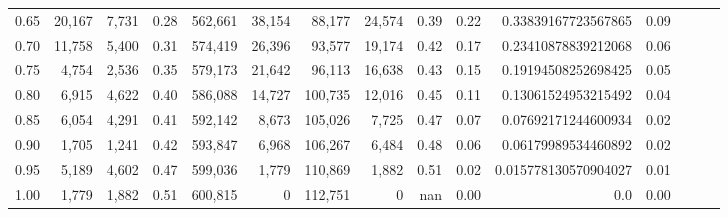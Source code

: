 \begin{tabular}{rrrrrrrrrrrrrrr}
0.65 &  20,167 &   7,731 &  0.28 &  562,661 &   38,154 &   88,177 &   24,574 &  0.39 &  0.22 &   0.33839167723567865 &      0.09 \\
0.70 &  11,758 &   5,400 &  0.31 &  574,419 &   26,396 &   93,577 &   19,174 &  0.42 &  0.17 &   0.23410878839212068 &      0.06 \\
0.75 &   4,754 &   2,536 &  0.35 &  579,173 &   21,642 &   96,113 &   16,638 &  0.43 &  0.15 &   0.19194508252698425 &      0.05 \\
0.80 &   6,915 &   4,622 &  0.40 &  586,088 &   14,727 &  100,735 &   12,016 &  0.45 &  0.11 &   0.13061524953215492 &      0.04 \\
0.85 &   6,054 &   4,291 &  0.41 &  592,142 &    8,673 &  105,026 &    7,725 &  0.47 &  0.07 &   0.07692171244600934 &      0.02 \\
0.90 &   1,705 &   1,241 &  0.42 &  593,847 &    6,968 &  106,267 &    6,484 &  0.48 &  0.06 &   0.06179989534460892 &      0.02 \\
0.95 &   5,189 &   4,602 &  0.47 &  599,036 &    1,779 &  110,869 &    1,882 &  0.51 &  0.02 &  0.015778130570904027 &      0.01 \\
1.00 &   1,779 &   1,882 &  0.51 &  600,815 &        0 &  112,751 &        0 &   nan &  0.00 &                   0.0 &      0.00 \\
\bottomrule
\end{tabular}
